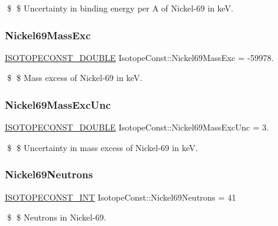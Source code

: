 \$ \$ Uncertainty in binding energy per A of Nickel-\/69 in keV. \mbox{\label{group___isotope_const-_nickel-_ni69_ga0e5cb0bf9b9eab6c7987b85a00522150}} 
\subsubsection{\texorpdfstring{Nickel69\+Mass\+Exc}{Nickel69MassExc}}
{\footnotesize\ttfamily \mbox{\hyperlink{group___isotope_const-_macros_ga8f45a7272ce02c0b4c65c44636ed719a}{I\+S\+O\+T\+O\+P\+E\+C\+O\+N\+S\+T\+\_\+\+D\+O\+U\+B\+LE}} Isotope\+Const\+::\+Nickel69\+Mass\+Exc = -\/59978.}

\$ \$ Mass excess of Nickel-\/69 in keV. \mbox{\label{group___isotope_const-_nickel-_ni69_ga402802963f0efa768935f7b3aa57fd4d}} 
\subsubsection{\texorpdfstring{Nickel69\+Mass\+Exc\+Unc}{Nickel69MassExcUnc}}
{\footnotesize\ttfamily \mbox{\hyperlink{group___isotope_const-_macros_ga8f45a7272ce02c0b4c65c44636ed719a}{I\+S\+O\+T\+O\+P\+E\+C\+O\+N\+S\+T\+\_\+\+D\+O\+U\+B\+LE}} Isotope\+Const\+::\+Nickel69\+Mass\+Exc\+Unc = 3.}

\$ \$ Uncertainty in mass excess of Nickel-\/69 in keV. \mbox{\label{group___isotope_const-_nickel-_ni69_ga87dcac36cc46eddee7a694711498bc34}} 
\subsubsection{\texorpdfstring{Nickel69\+Neutrons}{Nickel69Neutrons}}
{\footnotesize\ttfamily \mbox{\hyperlink{group___isotope_const-_macros_ga5f18360b3e99483a35c32d789e62621c}{I\+S\+O\+T\+O\+P\+E\+C\+O\+N\+S\+T\+\_\+\+I\+NT}} Isotope\+Const\+::\+Nickel69\+Neutrons = 41}

\$ \$ Neutrons in Nickel-\/69. \mbox{\label{group___isotope_const-_nickel-_ni69_ga3e145e0180ff0fe65d764019458484a5}} 
